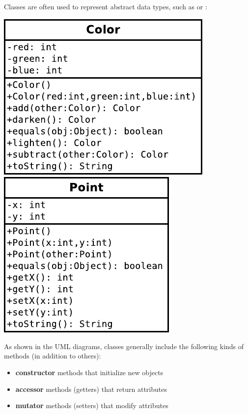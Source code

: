
Classes are often used to represent abstract data types, such as  or :

\begin{center}
\includegraphics{Color.pdf}  %
~~~~~
\includegraphics{Point.pdf}  %
\end{center}

As shown in the UML diagrams, classes generally include the following kinds of methods (in addition to others):

\begin{itemize}[itemsep=0pt]
\item \textbf{constructor} methods that initialize new objects
\item \textbf{accessor} methods (getters) that return attributes
\item \textbf{mutator} methods (setters) that modify attributes
\end{itemize}

